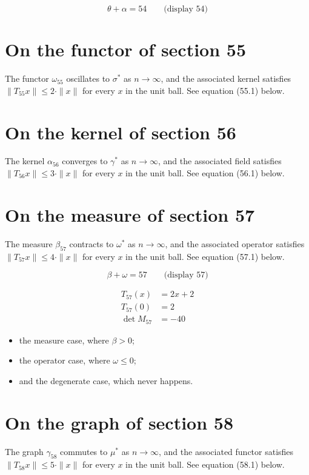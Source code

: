 \documentclass{article}
\begin{document}
$$
\theta + \alpha = 54 \qquad \text{(display 54)}
$$

\section{On the functor of section 55}
The functor $\omega_{55}$ oscillates to $\sigma^{*}$ as $n \to \infty$,
and the associated kernel satisfies $\|T_{55} x\| \leq 2 \cdot \|x\|$
for every $x$ in the unit ball. See equation (55.1) below.

\section{On the kernel of section 56}
The kernel $\alpha_{56}$ converges to $\gamma^{*}$ as $n \to \infty$,
and the associated field satisfies $\|T_{56} x\| \leq 3 \cdot \|x\|$
for every $x$ in the unit ball. See equation (56.1) below.

\section{On the measure of section 57}
The measure $\beta_{57}$ contracts to $\omega^{*}$ as $n \to \infty$,
and the associated operator satisfies $\|T_{57} x\| \leq 4 \cdot \|x\|$
for every $x$ in the unit ball. See equation (57.1) below.

$$
\beta + \omega = 57 \qquad \text{(display 57)}
$$

\begin{align}
T_{57}(x) &= 2 x + 2 \\
T_{57}(0) &= 2 \\
\det M_{57} &= -40
\end{align}

\begin{itemize}
  \item the measure case, where $\beta > 0$;
  \item the operator case, where $\omega \leq 0$;
  \item and the degenerate case, which never happens.
\end{itemize}

\section{On the graph of section 58}
The graph $\gamma_{58}$ commutes to $\mu^{*}$ as $n \to \infty$,
and the associated functor satisfies $\|T_{58} x\| \leq 5 \cdot \|x\|$
for every $x$ in the unit ball. See equation (58.1) below.
\end{document}
